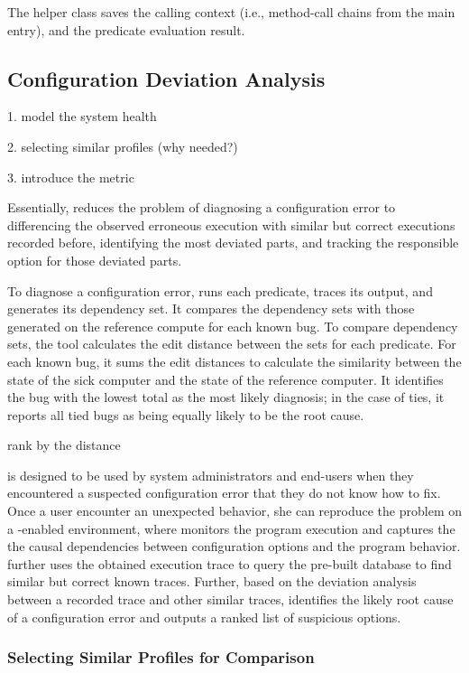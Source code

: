 The helper class  saves the calling context (i.e.,
method-call chains from the main entry), and the predicate evaluation result.


\subsection{Configuration Deviation Analysis}
\label{sec:analysis}

1. model the system health

2. selecting similar profiles (why needed?)

3. introduce the metric

Essentially, \ourtool reduces the problem of diagnosing a
configuration error to differencing the observed erroneous 
execution with similar but correct executions recorded before,
identifying the most deviated parts, and tracking the responsible
option for those deviated parts.

To diagnose a configuration error, \ourtool runs each predicate, traces its
output, and generates its dependency set. It compares the dependency sets
with those generated on the reference compute for each known bug. To compare
dependency sets, the tool calculates the edit distance between the sets
for each predicate. For each known bug, it sums the edit
distances to calculate the similarity between the state of the sick
computer and the state of the reference computer. It identifies the bug
with the lowest total as the most likely diagnosis; in the case of ties,
it reports all tied bugs as being equally likely to be the root cause.

rank by the distance


\ourtool is designed to be used by system administrators and end-users when they
encountered a suspected configuration error that they do not
know how to fix. Once a \ourtool user encounter an unexpected
behavior, she can reproduce the problem on a \ourtool-enabled environment,
where \ourtool monitors the program execution and captures
the the causal dependencies between
configuration options and the program behavior. \ourtool
further uses the obtained execution trace to query the pre-built database
to find similar but correct known traces. Further, based on
the deviation analysis between a recorded trace and other similar traces,
\ourtool identifies the likely root cause of a configuration error and
outputs a ranked list of suspicious options.

\subsubsection{Selecting Similar Profiles for Comparison}

